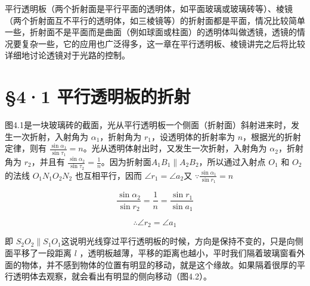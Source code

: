 平行透明板（两个折射面是平行平面的透明体，如平面玻璃或玻璃砖等）、棱镜（两个折射面互不平行的透明体，如三棱镜等）的折射面都是平面，情况比较简单一些，折射面不是平面而是曲面（例如球面或柱面）的透明体叫做透镜，透镜的情况要复杂一些，它的应用也广泛得多，这一章在平行透明板、棱镜讲完之后将比较详细地讨论透镜对于光路的控制。

\section{§4·1
平行透明板的折射}

图4.1是一块玻璃砖的截面，光从平行透明板一个侧面（折射面）斜射进来时，发生一次折射，入射角为
\(\alpha_{1}\)，折射角为 \(r_{1}\)，设透明体的折射率为
\(n\)，根据光的折射定律，则有
\(\frac{\sin \alpha_{1}}{\sin \tau_{1}} = n\)。光从透明体射出时，又发生一次折射，入射角为
\(\alpha_{2}\)，折射角为 \(r_{2}\)，并且有
\(\frac{\sin \alpha_{2}}{\sin \tau_{2}} = \frac{1}{n}\)。因为折射面\(A_{1}B_{1}\parallel A_{2}B_{2}\)，所以通过入射点
\(O_{1}\) 和 \(O_{2}\) 的法线 \(O_{1}N_{1}\)\(O_{2}N_{2}\)
也互相平行，因而 \(\angle r_{1}=\angle a_{2}\)又
\(\because \frac{\sin\alpha_1}{\sin r_1} = n\)

\[
\frac {\sin \alpha_ {2}}{\sin r _ {2}} = \frac {1}{n} = \frac {\sin r _ {1}}{\sin a _ {1}}
\]

\[
\therefore \angle r _ {2} = \angle a _ {1}
\]

即
\(S_{2}O_{2}\parallel S_{1}O_{1}\)这说明光线穿过平行透明板的时候，方向是保持不变的，只是向侧面平移了一段距离
\(l\)
，透明板越薄，平移的距离也越小，平时我们隔着玻璃窗看外面的物体，并不感到物体的位置有明显的移动，就是这个缘故。如果隔着很厚的平行透明体去观察，就会看出有明显的侧向移动（图4.2）。

